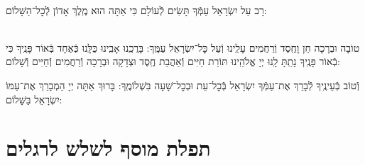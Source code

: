 \documentclass[twoside, openany, parskip=half, 11pt]{book}
\begin{document}
\begin{sometimes}
\begin{paracol}{2}
\\
 רָב עַל יִשְׂרָאֵל עַמְּֿךָ תָּשִׂים לְֿעוֹלָם כִּי אַתָּה הוּא מֶֽלֶךְ אָדוֹן לְֿכׇל־הַשָּׁלוֹם:

\switchcolumn


\begin{small}
\\
 טוֹבָה וּבְרָכָה חֵן וָחֶֽסֶד וְֿרַחֲמִים עָלֵֽינוּ וְֿעַל כׇּל־יִשְׂרָאֵל עַמֶּֽךָ: בָּרֲכֵֽנוּ אָבִֽינוּ כֻּלָּֽנוּ כְּֿאֶחָד בְּֿאוֹר פָּנֶֽיךָ כִּי בְֿאוֹר פָּנֶֽיךָ נָתַֽתָּ לָֽנוּ יְיָ אֱלֹהֵֽינוּ תּוֹרַת חַיִּים וְֿאַהֲבַת חֶֽסֶד וּצְדָקָה וּבְרָכָה וְֿרַחֲמִים וְֿחַיִּים וְֿשָׁלוֹם:

\end{small}


\end{paracol}
 וְֿטוֹב בְּֿעֵינֶֽיךָ לְֿבָרֵךְ אֶת־עַמְּֿךָ יִשְׂרָאֵל בְּֿכׇל־עֵת וּבְכׇל־שָׁעָה בִּשְׁלוֹמֶֽךָ: בָּרוּךְ אַתָּה יְיָ הַמְבָרֵךְ אֶת־עַמּוֹ יִשְׂרָאֵל בַּשָּׁלוֹם:

\tachanunim


\vfill



\sepline

\chapter[תפלת מוסף לשלש לרגלים]{ תפלת מוסף לשלש לרגלים }
\label{musaphregel}



\specialsaavos

\specialsameisim


\begin{small}
\setlength{\LTpost}{0pt}
\begin{tabular}{ l p{} }


\end{tabular}
\end{small}
\end{sometimes}
\end{document}
